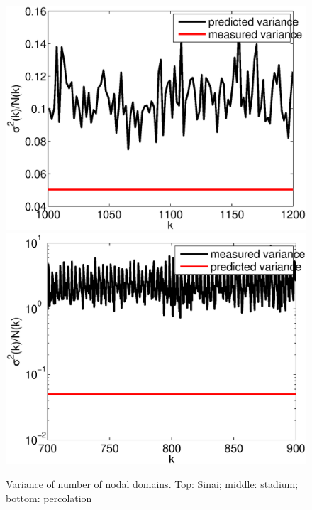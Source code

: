 \documentclass{report}
\begin{document}
\begin{figure}
  \begin{center}
    \includegraphics[width=\textwidth]{figs/results/qugrs_1000_to_1200_variance.eps}
    \includegraphics[width=\textwidth]{figs/results/qust_700_to_900_variance.eps}

    \caption{Variance of number of nodal domains. Top: Sinai; middle: stadium; bottom: percolation}
    \label{fig:variance}
  \end{center}
\end{figure}
\end{document}
